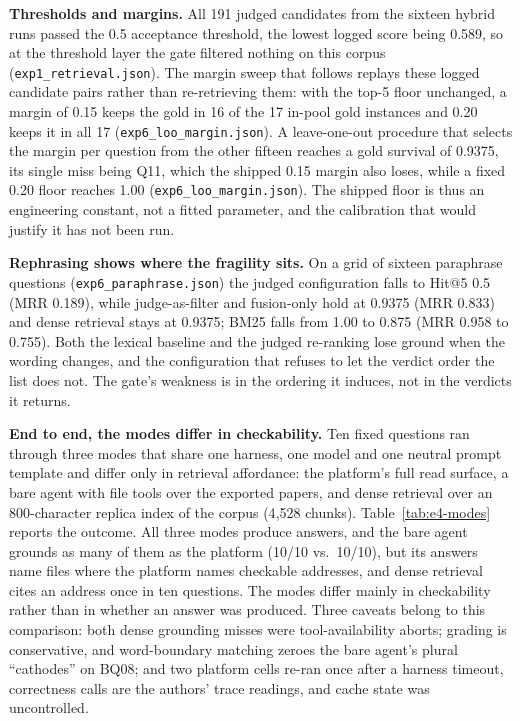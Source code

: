 \textbf{Thresholds and margins.} All 191 judged candidates from the sixteen
hybrid runs passed the 0.5 acceptance threshold, the lowest logged score being
0.589, so at the threshold layer the gate filtered nothing on this corpus
(\texttt{exp1\_retrieval.json}). The margin sweep that follows replays these
logged candidate pairs rather than re-retrieving them: with the top-5 floor
unchanged, a margin of 0.15 keeps the gold in 16 of the 17 in-pool gold
instances and 0.20 keeps it in all 17
(\texttt{exp6\_loo\_margin.json}). A leave-one-out procedure that
selects the margin per question from the other fifteen reaches a gold survival
of 0.9375, its single miss being Q11, which the shipped 0.15 margin also
loses, while a fixed 0.20 floor reaches 1.00
(\texttt{exp6\_loo\_margin.json}). The shipped floor is thus an engineering
constant, not a fitted parameter, and the calibration that would justify it
has not been run.

\textbf{Rephrasing shows where the fragility sits.} On a grid of sixteen
paraphrase questions (\texttt{exp6\_paraphrase.json}) the judged configuration
falls to Hit@5 0.5 (MRR 0.189), while judge-as-filter and fusion-only hold at
0.9375 (MRR 0.833) and dense retrieval stays at 0.9375; BM25 falls from 1.00
to 0.875 (MRR 0.958 to 0.755). Both the lexical baseline and the judged
re-ranking lose ground when the wording changes, and the configuration that
refuses to let the verdict order the list does not. The gate's weakness is in
the ordering it induces, not in the verdicts it returns.

\textbf{End to end, the modes differ in checkability.} Ten fixed questions ran
through three modes that share one harness, one model and one neutral prompt
template and differ only in retrieval affordance: the platform's full read
surface, a bare agent with file tools over the exported papers, and dense
retrieval over an 800-character replica index of the corpus (4{,}528 chunks).
Table~\ref{tab:e4-modes} reports the outcome. All three modes produce answers,
and the bare agent grounds as many of them as the platform
(10/10 vs.\ 10/10), but its answers name files where the platform names
checkable addresses, and dense retrieval cites an address once in ten
questions. The modes differ mainly in checkability rather than in whether an
answer was produced. Three caveats belong to this comparison: both dense
grounding misses were tool-availability aborts; grading is conservative, and
word-boundary matching zeroes the bare agent's plural ``cathodes'' on BQ08; and
two platform cells re-ran once after a harness timeout, correctness calls are
the authors' trace readings, and cache state was uncontrolled.

